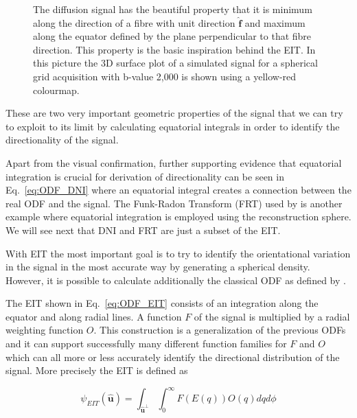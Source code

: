 \documentclass{bioinfo}
\begin{document}
\begin{methods}
\begin{figure}
\caption{The diffusion signal has the beautiful property that it is minimum
along the direction of a fibre with unit direction $\mathbf{\hat{\bm{f}}}$
and maximum along the equator defined by the plane perpendicular to
that fibre direction. This property is the basic inspiration behind
the EIT. In this picture the 3D surface plot of a simulated signal
for a spherical grid acquisition with b-value 2,000 is shown using
a yellow-red colourmap.}


\label{Flo:single_fibre_spherical_grid}
\end{figure}


These are two very important geometric properties of the signal that
we can try to exploit to its limit by calculating equatorial integrals
in order to identify the directionality of the signal. 

Apart from the visual confirmation, further supporting evidence that
equatorial integration is crucial for derivation of directionality
can be seen in Eq.~\ref{eq:ODF_DNI} where an equatorial integral
creates a connection between the real ODF and the signal. The Funk-Radon
Transform (FRT) used by \citet{Tuch2004} is another example where
equatorial integration is employed using the reconstruction sphere.
We will see next that DNI and FRT are just a subset of the EIT.

With EIT the most important goal is to try to identify the orientational
variation in the signal in the most accurate way by generating a spherical
density. However, it is possible to calculate additionally the classical
ODF as defined by \citet{Wedeen}.

The EIT shown in Eq.~\ref{eq:ODF_EIT} consists of an integration
along the equator and along radial lines. A function $F$ of the signal
is multiplied by a radial weighting function $O$. This construction
is a generalization of the previous ODFs and it can support successfully
many different function families for $F$ and $O$ which can all more
or less accurately identify the directional distribution of the signal.
More precisely the EIT is defined as

%
\begin{equation}
\psi_{EIT}(\hat{\mathbf{u}})=\int_{\hat{\mathbf{u}}^{\perp}}\int_{0}^{\infty}F(E(q))O(q)dqd\phi\label{eq:ODF_EIT}\end{equation}



\end{methods}
\end{document}
